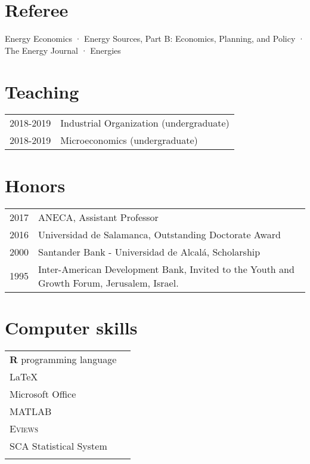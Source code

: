 \documentclass[11pt]{article}\usepackage[]{graphicx}\usepackage[]{color}
\begin{document}
\section{Referee} 

\raggedright
Energy Economics · Energy Sources, Part B: Economics, Planning, and Policy · The Energy Journal · Energies


\section{Teaching} 

\begin{tabular}{R{2cm} | L{12cm}}

2018-2019 & Industrial Organization (undergraduate)\\

2018-2019 & Microeconomics (undergraduate)\\

\end{tabular}


\section{Honors} 

\begin{tabular}{R{2cm} | L{12cm}}

2017 & ANECA, Assistant Professor\\

2016 & Universidad de Salamanca, Outstanding Doctorate Award\\

2000	& Santander Bank - Universidad de Alcalá, Scholarship\\

1995 & Inter-American Development Bank, Invited to the Youth and Growth Forum, Jerusalem, Israel.\\

\end{tabular}


\section{Computer skills} 

\begin{tabular}{ll}
\textbf{\textsf{R}} programming language\\
{\LaTeX}\\
Microsoft Office\\
\textsc{MATLAB}\\
\textsc{Eviews}\\
SCA Statistical System\\
&
\end{tabular}
\end{document}
